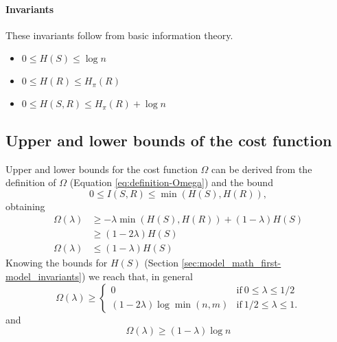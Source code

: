 \paragraph{Invariants} These invariants follow from basic information theory.
\cite{Cover1999}

\begin{itemize}
\item $0 \leq H(S) \leq \log n$
\item $0 \leq H(R) \leq H_\pi(R)$
\item $0 \leq H(S,R) \leq H_\pi(R) + \log n$
\end{itemize}

\subsection{Upper and lower bounds of the cost function}
\label{sec:model_math_lower-bound-cost-fun}

Upper and lower bounds for the cost function $\Omega$ can be derived from the definition of $\Omega$ (Equation \eqref{eq:definition-Omega}) and the bound \cite{Cover1999}
\begin{equation}
  \label{eq:bounds-mutual-information}
  0 \leq I(S,R) \leq \min(H(S),H(R)),
\end{equation}
obtaining
\begin{align*}
  \Omega(\lambda) &\geq -\lambda \min(H(S),H(R)) + (1-\lambda) H(S) \\
                  &\geq (1-2\lambda)H(S) \\
  \Omega(\lambda) &\leq (1-\lambda)H(S)
\end{align*}
Knowing the bounds for $H(S)$ (Section \ref{sec:model_math_first-model_invariants}) we reach that, in general
\begin{equation}
  \label{eq:lower-bound-Omega}
  \Omega(\lambda) \geq
  \begin{cases}
    0                           & \text{if}~0 \leq \lambda \leq 1/2 \\
    (1-2\lambda) \log \min(n,m) & \text{if}~1/2 \leq \lambda \leq 1.
  \end{cases}
\end{equation}
and
\begin{equation}
  \label{eq:upper-bound-Omega}
  \Omega(\lambda) \geq (1 - \lambda) \log n
\end{equation}

\subsection{}
\label{sec:model_math_min-max-cost-fun}

